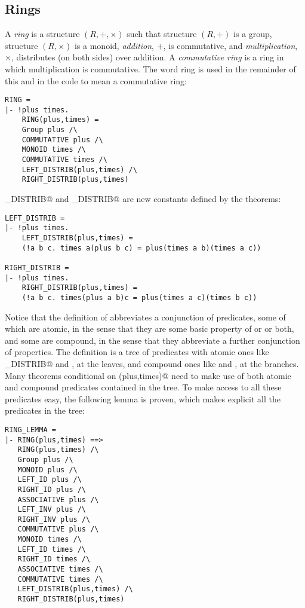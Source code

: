 \subsection{Rings}

A {\em ring} is a structure $(R,+,\times)$ such that structure $(R,+)$ 
is a group, structure $(R,\times)$ is a monoid, {\em addition}, $+$, is 
commutative, and {\em multiplication}, $\times$, distributes (on both sides) 
over addition.  A {\em commutative ring} is a ring in which multiplication 
is commutative.  The word ring is used in the remainder of this \self{} 
and in the \HOL{} code to mean a commutative ring:
\begin{session}
\begin{verbatim}
RING = 
|- !plus times.
    RING(plus,times) =
    Group plus /\
    COMMUTATIVE plus /\
    MONOID times /\
    COMMUTATIVE times /\
    LEFT_DISTRIB(plus,times) /\
    RIGHT_DISTRIB(plus,times)
\end{verbatim}
\end{session}
\verb@LEFT_DISTRIB@ and \verb@RIGHT_DISTRIB@ are new constants
defined by the theorems:
\begin{session}
\begin{verbatim}
LEFT_DISTRIB = 
|- !plus times.
    LEFT_DISTRIB(plus,times) =
    (!a b c. times a(plus b c) = plus(times a b)(times a c))

RIGHT_DISTRIB = 
|- !plus times.
    RIGHT_DISTRIB(plus,times) =
    (!a b c. times(plus a b)c = plus(times a c)(times b c))
\end{verbatim}
\end{session}
Notice that the definition of \verb@RING@ abbreviates a conjunction of 
predicates, some of which are atomic, in the sense that they are some basic 
property of \verb@plus@ or \verb@times@ or both, and some are compound, 
in the sense that they abbreviate a further conjunction of properties.  
The definition is a tree of predicates with atomic ones like 
\verb@LEFT_DISTRIB@ and \verb@ASSOCIATIVE@, at the leaves, and compound 
ones like \verb@Group@ and \verb@MONOID@, at the branches.  Many theorems 
conditional on \verb@RING(plus,times)@ need to make use of both atomic 
and compound predicates contained in the tree.  To make access to all these 
predicates easy, the following lemma is proven, which makes explicit all 
the predicates in the tree: 
\begin{session}
\begin{verbatim}
RING_LEMMA = 
|- RING(plus,times) ==>
   RING(plus,times) /\
   Group plus /\
   MONOID plus /\
   LEFT_ID plus /\
   RIGHT_ID plus /\
   ASSOCIATIVE plus /\
   LEFT_INV plus /\
   RIGHT_INV plus /\
   COMMUTATIVE plus /\
   MONOID times /\
   LEFT_ID times /\
   RIGHT_ID times /\
   ASSOCIATIVE times /\
   COMMUTATIVE times /\
   LEFT_DISTRIB(plus,times) /\
   RIGHT_DISTRIB(plus,times)
\end{verbatim}
\end{session}
